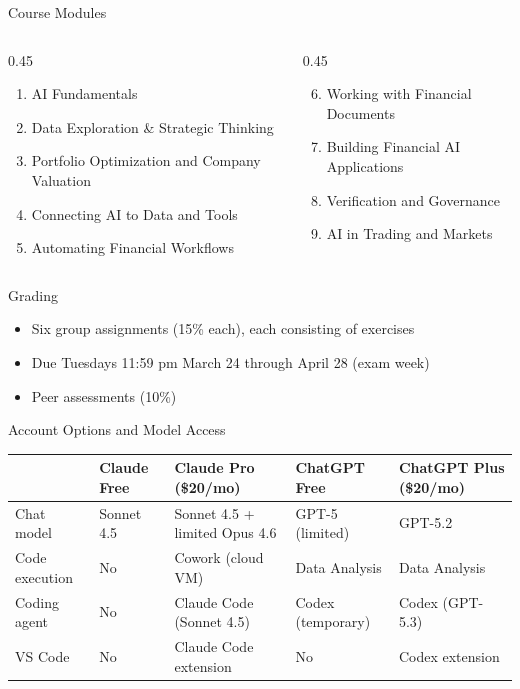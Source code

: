 \documentclass[aspectratio=169]{beamer}
\begin{document}
\begin{frame}{Course Modules}
\begin{columns}[T]
\begin{column}{0.45\textwidth}
\begin{enumerate}
  \item AI Fundamentals
  \item Data Exploration \& Strategic Thinking
  \item Portfolio Optimization and Company Valuation
  \item Connecting AI to Data and Tools
  \item Automating Financial Workflows
\end{enumerate}
\end{column}
\begin{column}{0.45\textwidth}
\begin{enumerate}
  \setcounter{enumi}{5}
  \item Working with Financial Documents
  \item Building Financial AI Applications
  \item Verification and Governance
  \item AI in Trading and Markets
\end{enumerate}
\end{column}
\end{columns}
\end{frame}

\begin{frame}{Grading}
  \begin{itemize}
\item Six group assignments (15\% each), each consisting of exercises
\item Due Tuesdays 11:59 pm March 24 through April 28 (exam week)
\item Peer assessments (10\%)
  \end{itemize}
\end{frame}

\begin{frame}[shrink=5]{Account Options and Model Access}
\begin{center}\scriptsize
\begin{tabular}{@{} p{2.2cm} p{2.5cm} p{2.5cm} p{2.5cm} p{2.5cm} @{}}
\toprule
& \textbf{Claude Free} & \textbf{Claude Pro (\$20/mo)} & \textbf{ChatGPT Free} & \textbf{ChatGPT Plus (\$20/mo)} \\
\midrule
Chat model & Sonnet 4.5 & Sonnet 4.5 + limited Opus 4.6 & GPT-5 (limited) & GPT-5.2 \\
Code execution & No & Cowork (cloud VM) & Data Analysis & Data Analysis \\
Coding agent & No & Claude Code (Sonnet 4.5) & Codex (temporary) & Codex (GPT-5.3) \\
VS Code & No & Claude Code extension & No & Codex extension \\
\bottomrule
\end{tabular}
\end{center}
\end{frame}
\end{document}
